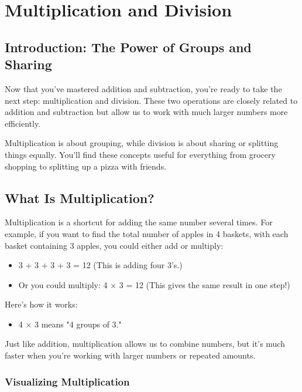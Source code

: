 \chapter{Multiplication and Division}

\section{Introduction: The Power of Groups and Sharing}
Now that you’ve mastered addition and subtraction, you’re ready to take the next step: multiplication and division. These two operations are closely related to addition and subtraction but allow us to work with much larger numbers more efficiently.

Multiplication is about grouping, while division is about sharing or splitting things equally. You’ll find these concepts useful for everything from grocery shopping to splitting up a pizza with friends.

\section{What Is Multiplication?}
Multiplication is a shortcut for adding the same number several times. For example, if you want to find the total number of apples in 4 baskets, with each basket containing 3 apples, you could either add or multiply:
\begin{itemize}
    \item 3 + 3 + 3 + 3 = 12 (This is adding four 3’s.)
    \item Or you could multiply: 4 × 3 = 12 (This gives the same result in one step!)
\end{itemize}

Here’s how it works:
\begin{itemize}
    \item 4 × 3 means "4 groups of 3."
\end{itemize}

Just like addition, multiplication allows us to combine numbers, but it’s much faster when you’re working with larger numbers or repeated amounts.
\subsection{Visualizing Multiplication}
\begin{center}
\end{center}

